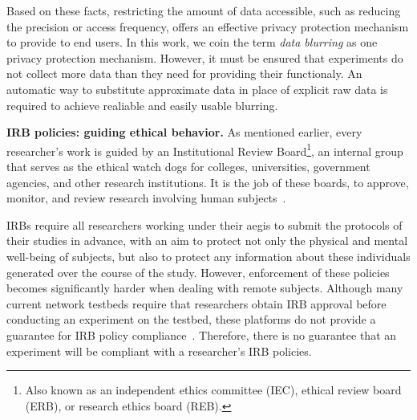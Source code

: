 Based on these facts, restricting 
the amount of data accessible, such as reducing the precision or 
access frequency, offers an effective privacy protection mechanism to 
provide to end users. In this work, we coin the term \textit{data blurring}
as one privacy protection mechanism. However, it must be ensured that  
experiments do not collect more data than they need for providing 
their functionaly. 
An automatic way to substitute approximate data in place of explicit raw data 
is required to achieve realiable and easily usable blurring.


\textbf{IRB policies: guiding ethical behavior.}
As mentioned earlier, every researcher's work is guided by an 
Institutional Review Board\footnote{\scriptsize Also known as an 
independent ethics committee (IEC), ethical review board (ERB), 
or research ethics board (REB).}, an internal group that serves as 
the ethical watch dogs for colleges, universities, government agencies, 
and other research institutions. It is the job of these boards, 
to approve, monitor, and review research involving human 
subjects~\cite{irb}. 
\begin{comment}
While a commitment to ethical treatment of humans who 
submit to experiments has always been part of the professional codes of most 
scientists, IRBs did not become ubiquitous in research facilities until the 
latter part of the 20th century.  Partly provoked by atrocities committed by 
the Nazis in the name of scientific experiments in the Second World War II, 
and partly inspired by directives from the medical community, including 
Declaration of Helsinki established In 1964 by the World Medical Association, 
research institutions formally acknowledged the need to protect human subjects 
in any research setting. Today, 
\end{comment}
IRBs require all researchers working under 
their aegis to submit the protocols of their studies in advance, with an aim to 
protect not only the physical and mental well-being of subjects, 
but also to protect any information about these individuals generated 
over the course of the study. However, enforcement of these policies becomes significantly harder when dealing with remote subjects. Although many current network 
testbeds require that researchers obtain IRB approval before conducting
an experiment on the testbed, these platforms do not provide a guarantee 
for IRB policy compliance~\cite{nandugudi2013phonelab, nikravesh2015mobilyzer}.
Therefore, there is no guarantee that an 
experiment will be compliant with a researcher's IRB policies. 

